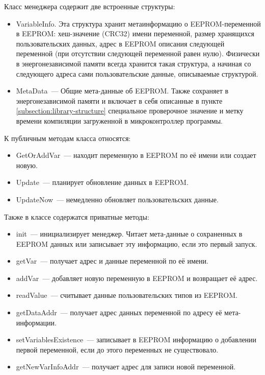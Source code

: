 Класс менеджера содержит две встроенные структуры:

\begin{itemize}
	\item VariableInfo. Эта структура хранит метаинформацию о EEPROM-переменной в EEPROM: хеш-значение (CRC32) имени переменной, размер хранящихся пользовательских данных, адрес в EEPROM описания следующей переменной (при отсутствии следующей переменной равен нулю).
	Физически в энергонезависимой памяти всегда хранится такая структура, а начиная со следующего адреса сами пользовательские данные, описываемые структурой.

	\item MetaData~--- Общие мета-данные об EEPROM.
	Также сохраняет в энергонезависимой памяти и включает в себя описанные в пункте \ref{subsection:library-structure} специальное проверочное значение и метку времени компиляции загруженной в микроконтроллер программы.
\end{itemize}

К публичным методам класса относятся:
\begin{itemize}
	\item GetOrAddVar~--- находит переменную в EEPROM по её имени или создает новую.
	\item Update~--- планирует обновление данных в EEPROM.
	\item UpdateNow~--- немедленно обновляет пользовательских данные.
\end{itemize}

Также в классе содержатся приватные методы:

\begin{itemize}
	\item init~--- инициализирует менеджер. Читает мета-данные о сохраненных в EEPROM данных или записывает эту информацию, если это первый запуск.
	\item getVar~--- получает адрес и данные переменной по её имени.
	\item addVar~--- добавляет новую переменную в EEPROM и возвращает её адрес.
	\item readValue~--- считывает данные пользовательских типов из EEPROM.
	\item getDataAddr~--- получает адрес данных переменной по адресу её мета-информации.
	\item setVariablesExistence~--- записывает в EEPROM информацию о добавлении первой переменной, если до этого переменных не существовало.
	\item getNewVarInfoAddr~--- получает адрес для записи новой переменной.
\end{itemize}

